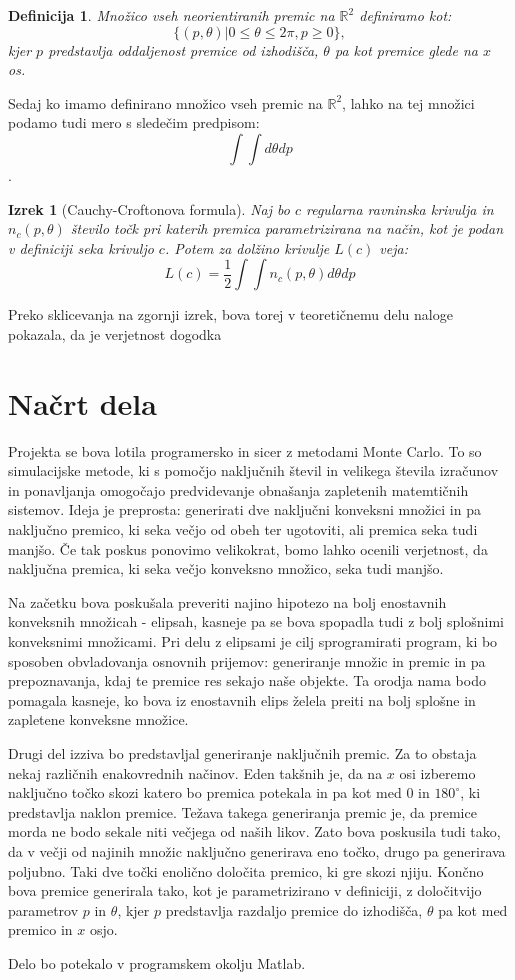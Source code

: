 \documentclass[a4paper]{article}
\newtheorem{definicija}{Definicija}[section]
\newtheorem{izrek}{Izrek}
\begin{document}
\begin{definicija}
Množico vseh neorientiranih premic na $\mathbb{R}^2$ definiramo kot: $$ \{ (p,\theta)|0 \le \theta \le 2 \pi , p \ge 0\},$$ kjer $p$ predstavlja oddaljenost premice od izhodišča, $\theta$ pa kot premice glede na $x$ os.
\end{definicija}

Sedaj ko imamo definirano množico vseh premic na $\mathbb{R}^2$, lahko na tej množici podamo tudi mero s sledečim predpisom: $$ \int \int d\theta dp$$.

\begin{izrek}[Cauchy-Croftonova formula]
 Naj bo $c$ regularna ravninska krivulja in $n_c (p, \theta)$  število točk pri katerih premica parametrizirana na način, kot je podan v definiciji seka krivuljo $c$. Potem za dolžino krivulje $L(c)$ veja: $$L(c) = \frac{1}{2}\int \int n_c (p, \theta) d\theta dp $$
 \end{izrek}
 
 Preko sklicevanja na zgornji izrek, bova torej v teoretičnemu delu naloge pokazala, da je verjetnost dogodka  






 
\section{Načrt dela}
Projekta se bova lotila programersko in sicer z metodami Monte Carlo. To so simulacijske metode, ki s pomočjo naključnih števil in velikega števila izračunov in ponavljanja omogočajo predvidevanje obnašanja zapletenih matemtičnih sistemov. Ideja je preprosta: generirati dve naključni konveksni množici in pa naključno premico, ki seka večjo od obeh ter ugotoviti, ali premica seka tudi manjšo. Če tak poskus ponovimo velikokrat, bomo lahko ocenili verjetnost, da naključna premica, ki seka večjo konveksno množico, seka tudi manjšo.

Na začetku bova poskušala preveriti najino hipotezo na bolj enostavnih konveksnih množicah - elipsah, kasneje pa se bova spopadla tudi z bolj splošnimi konveksnimi množicami. Pri delu z elipsami je cilj sprogramirati program, ki bo sposoben obvladovanja osnovnih prijemov: generiranje množic in premic in pa prepoznavanja, kdaj te premice res sekajo naše objekte. Ta orodja nama bodo pomagala kasneje, ko bova iz enostavnih elips želela preiti na bolj splošne in zapletene konveksne množice.

Drugi del izziva bo predstavljal generiranje naključnih premic. Za to obstaja nekaj različnih enakovrednih načinov. Eden takšnih je, da na $x$ osi izberemo naključno točko skozi katero bo premica potekala in pa kot med $0$ in $180^\circ$, ki predstavlja naklon premice. Težava takega generiranja premic je, da premice morda ne bodo sekale niti večjega od naših likov. Zato bova poskusila tudi tako, da v večji od najinih množic naključno generirava eno točko, drugo pa generirava poljubno. Taki dve točki enolično določita premico, ki gre skozi njiju. Končno bova premice generirala tako, kot je parametrizirano v definiciji, z določitvijo parametrov $p$ in $\theta$, kjer $p$ predstavlja razdaljo premice do izhodišča, $\theta$ pa kot med premico in $x$ osjo.

Delo bo potekalo v programskem okolju Matlab.
\end{document}
